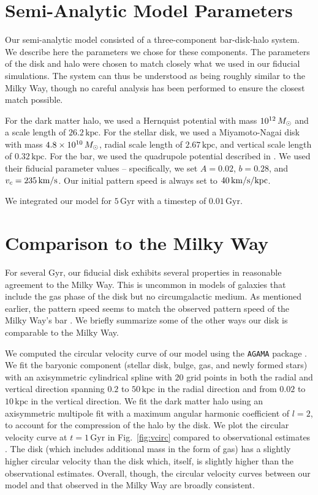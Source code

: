 \begin{appendices}
\section{Semi-Analytic Model Parameters}
\label{ch2:app:sam}
Our semi-analytic model consisted of a three-component bar-disk-halo system. We
describe here the parameters we chose for these components. The parameters of
the disk and halo were chosen to match closely what we used in our fiducial
simulations. The system can thus be understood as being roughly similar to the
Milky Way, though no careful analysis has been performed to ensure the closest
match possible.

For the dark matter halo, we used a Hernquist potential
\citep{1990ApJ...356..359H} with mass $10^{12}\,M_{\odot}$ and a scale length of
$26.2\,\textrm{kpc}$. For the stellar disk, we used a Miyamoto-Nagai disk
\citep{1975PASJ...27..533M} with mass $4.8\times10^{10}\,M_{\odot}$, radial scale
length of $2.67\,\textrm{kpc}$, and vertical scale length of
$0.32\,\textrm{kpc}$. For the bar, we used the quadrupole potential described in
\citet{2022MNRAS.513..768C}. We used their fiducial parameter values --
specifically, we set $A=0.02$, $b=0.28$, and $v_c = 235\,\textrm{km}/\textrm{s}$. Our initial
pattern speed is always set to $40\,\textrm{km}/\textrm{s}/\textrm{kpc}$.

We integrated our model for $5\,\textrm{Gyr}$ with a timestep of
$0.01\,\textrm{Gyr}$.

\section{Comparison to the Milky Way}
\label{ch2:app:milkyway}
For several Gyr, our fiducial disk exhibits several properties in reasonable
agreement to the Milky Way. This is uncommon in models of galaxies that include
the gas phase of the disk but no circumgalactic medium. As mentioned earlier,
the pattern speed seems to match the observed pattern speed of the Milky Way's
bar \citep{2019MNRAS.490.4740B}. We briefly summarize some of the other ways our
disk is comparable to the Milky Way.

We computed the circular velocity curve of our model using the \texttt{AGAMA}
package \citep{2019MNRAS.482.1525V}. We fit the baryonic component (stellar
disk, bulge, gas, and newly formed stars) with an axisymmetric cylindrical
spline with $20$ grid points in both the radial and vertical direction spanning
$0.2$ to $50\,\textrm{kpc}$ in the radial direction and from $0.02$ to
$10\,\textrm{kpc}$ in the vertical direction. We fit the dark matter halo using
an axisymmetric multipole fit with a maximum angular harmonic coefficient
of $l=2$, to account for the compression of the halo by the disk. We plot
the circular velocity curve at $t=1\,\textrm{Gyr}$ in Fig.~\ref{fig:vcirc}
compared to observational estimates \citep{2019ApJ...871..120E}. The \SMUGGLE{}
disk (which includes additional mass in the form of gas) has a slightly higher
circular velocity than the \Nbody{} disk which, itself, is slightly higher than
the observational estimates. Overall, though, the circular velocity curves
between our model and that observed in the Milky Way are broadly consistent.


\end{appendices}
